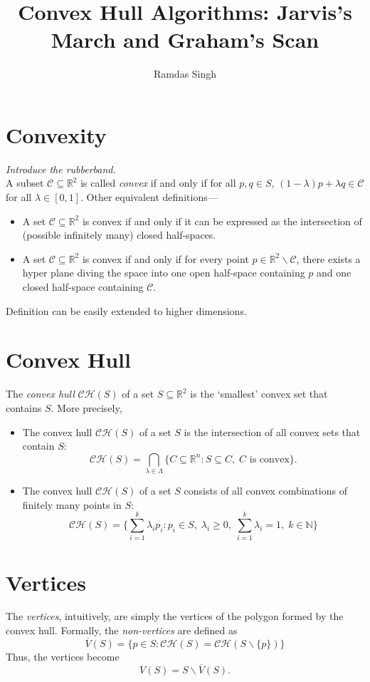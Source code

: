 \documentclass[12pt]{article}
\title{Convex Hull Algorithms: Jarvis’s March and Graham’s Scan}
\author{Ramdas Singh}
\date{}
\newcommand{\R}{\mathbb{R}}
\newcommand{\N}{\mathbb{N}}
\newcommand{\C}{\mathcal{C}}
\newcommand{\CH}{\mathcal{CH}}
\begin{document}
\maketitle

\section*{Convexity}
\textit{Introduce the rubberband.}\\

A subset $\C \subseteq \R^{2}$ is called \textit{convex} if and only if for all $p,q \in S$, $(1-\lambda) p + \lambda q \in \C$ for all $\lambda \in [0,1]$. Other equivalent definitions---
\begin{itemize}
    \item A set $\C \subseteq \R^{2}$ is convex if and only if it can be expressed as the intersection of (possible infinitely many) closed half-spaces.
    \item A set $\C \subseteq \R^{2}$ is convex if and only if for every point $p \in \R^{2}\backslash \C$, there exists a hyper plane diving the space into one open half-space containing $p$ and one closed half-space containing $\C$.
\end{itemize}
Definition can be easily extended to higher dimensions.

\section*{Convex Hull}
The \textit{convex hull} $\CH(S)$ of a set $S \subseteq \R^{2}$ is the `smallest' convex set that contains $S$. More precisely,
\begin{itemize}
    \item The convex hull $\CH(S)$ of a set $S$ is the intersection of all convex sets that contain $S$:
    \[
        \CH(S) = \bigcap_{\lambda \in \Lambda} \{C \subseteq \R^{n} : S \subseteq C,\; C \text{ is convex}\}.
    \]
    \item The convex hull $\CH(S)$ of a set $S$ consists of all convex combinations of finitely many points in $S$:
    \[
        \CH(S) = \{\sum_{i=1}^{k} \lambda_{i}p_{i} : p_{i} \in S,\; \lambda_{i} \geq 0,\; \sum_{i=1}^{k} \lambda_{i} = 1,\; k \in \N\}
    \]
\end{itemize}

\section*{Vertices}
The \textit{vertices}, intuitively, are simply the vertices of the polygon formed by the convex hull. Formally, the \textit{non-vertices} are defined as
\[
    \overline{V}(S) = \{p \in S: \CH(S) = \CH(S\backslash\{p\})\}
\]
Thus, the vertices become
\[
    V(S) = S\backslash \overline{V}(S).
\]
\end{document}
